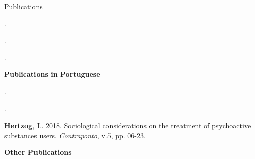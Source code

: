 \begin{rSection}{Publications}
\begin{etaremune}
\item {}. \href{https://doi.org/10.1080/13548506.2022.2108083}{\textcolor{mydoi}{\aiDoi}} 

\item {}. \href{https://doi.org/10.1080/13548506.2022.2108086}{\textcolor{mydoi}{\aiDoi}} 

\item {}. \href{https://doi.org/10.17159/sajs.2021/12290}{\textcolor{mydoi}{\aiDoi}} 
\end{etaremune}

\vspace{1em}
{\large \textbf {Publications in Portuguese}}
\vspace{1em}

\begin{etaremune}
\item {}. \href{http://dx.doi.org/10.4322/2316-1329.135}{\textcolor{mydoi}{\aiDoi}} 

\item {}. \href{https://doi.org/10.21680/1982-1662.2019v2n26ID15946 }{\textcolor{mydoi}{\aiDoi}} 

\item \textbf{Hertzog}, L. 2018. Sociological considerations on the treatment of psychoactive substances users. \textit{Contraponto}, v.5, pp. 06-23. \href{https://seer.ufrgs.br/contraponto/article/download/85460/49139}{\textcolor{mydoi}{\aiDoi}}

\item {} \href{https://periodicos.ufpe.br/revistas/revsocio/article/download/243412/33791}{\textcolor{mydoi}{\aiDoi}} 

\item {} \href{https://doi.org/10.5433/2176-6665.2015v20n2p312}{\textcolor{mydoi}{\aiDoi}} 
\end{etaremune}

\vspace{1em}
\large \textbf {Other Publications}
\vspace{1em}

\begin{etaremune}
\item {} \href{https://humanities.uct.ac.za/sites/default/files/content_migration/humanities_uct_ac_za/1380/files/WP457HeHertzogToskaCartyCluver.pdf}{\textcolor{mydoi}{\aiDoi}} 


\end{etaremune}
\end{rSection}
